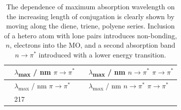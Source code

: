 \documentclass[
]{book}
\begin{document}
\begin{longtable}[]{@{}llll@{}}
\caption{\label{tab:lambdaconj} The dependence of maximum absorption wavelength on the increasing length of conjugation is clearly shown by moving along the diene, triene, polyene series. Inclusion of a hetero atom with lone pairs introduces non-bonding, \(n\), electrons into the MO, and a second absorption band \(n \longrightarrow \pi^\ast\) introduced with a lower energy transition.}\tabularnewline
\toprule
\begin{minipage}[b]{0.22\columnwidth}\raggedright
\strut
\end{minipage} & \begin{minipage}[b]{0.22\columnwidth}\raggedright
\(\lambda\)\textsubscript{max} / nm \(\pi \longrightarrow \pi^\ast\)\strut
\end{minipage} & \begin{minipage}[b]{0.22\columnwidth}\raggedright
\strut
\end{minipage} & \begin{minipage}[b]{0.22\columnwidth}\raggedright
\(\lambda\)\textsubscript{max} / nm \(n \longrightarrow \pi^\ast\) \(\pi \longrightarrow \pi^\ast\)\strut
\end{minipage}\tabularnewline
\midrule
\endfirsthead
\toprule
\begin{minipage}[b]{0.22\columnwidth}\raggedright
\strut
\end{minipage} & \begin{minipage}[b]{0.22\columnwidth}\raggedright
\(\lambda\)\textsubscript{max} / nm \(\pi \longrightarrow \pi^\ast\)\strut
\end{minipage} & \begin{minipage}[b]{0.22\columnwidth}\raggedright
\strut
\end{minipage} & \begin{minipage}[b]{0.22\columnwidth}\raggedright
\(\lambda\)\textsubscript{max} / nm \(n \longrightarrow \pi^\ast\) \(\pi \longrightarrow \pi^\ast\)\strut
\end{minipage}\tabularnewline
\midrule
\endhead
\begin{minipage}[t]{0.22\columnwidth}\raggedright
\strut
\end{minipage} & \begin{minipage}[t]{0.22\columnwidth}\raggedright
217\strut
\end{minipage} & \begin{minipage}[t]{0.22\columnwidth}\raggedright
\strut
\end{minipage} & \begin{minipage}[t]{0.22\columnwidth}\raggedright

\end{minipage}
\end{longtable}
\end{document}
